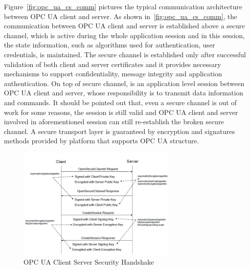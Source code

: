 Figure~\ref{fig:opc_ua_cs_comm} pictures the typical communication architecture between OPC UA client and server. As shown in~\ref{fig:opc_ua_cs_comm}, the communication between OPC UA client and server is established above a secure channel, which is active during the whole application session and in this session, the state information, such as algorithms used for authentication, user credentials, is maintained. The secure channel is established only after successful validation of both client and server certificates and it provides necessary mechanisms to support confidentiality, message integrity and application authentication. On top of secure channel, is an application level session between OPC UA client and server, whose responsibility is to transmit data information and commands. It should be pointed out that, even a secure channel is out of work for some reasons, the session is still valid and OPC UA client and server involved in aforementioned session can still re-establish the broken secure channel. A secure transport layer is guaranteed by encryption and signatures methods provided by platform that supports OPC UA structure.

\begin{figure}[!htbp]
	\centering
	\includegraphics[width=0.7\textwidth]{opc_ua_shs.jpg}
		\caption{OPC UA Client Server Security Handshake\cite{O2}}
	\label{fig:opc_ua_cs_shs}
\end{figure}

